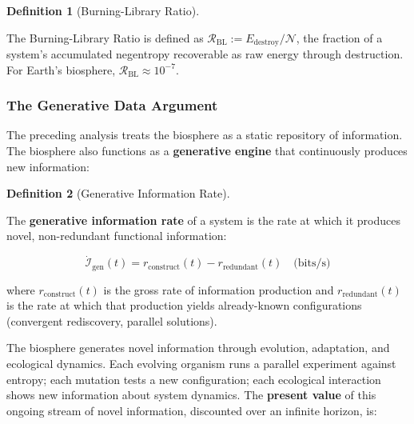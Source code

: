 \documentclass[11pt]{article}
\theoremstyle{plain}
\theoremstyle{definition}
\newtheorem{definition}{Definition}
\theoremstyle{remark}
\let\origsubsubsection\subsubsection
\renewcommand{\subsubsection}{\needspace{4\baselineskip}\origsubsubsection}
\begin{document}
\begin{definition}[Burning-Library Ratio]
\label{def-burning-library-ratio}

The Burning-Library Ratio is defined as $\mathcal{R}_{\text{BL}} := E_{\text{destroy}} / \mathcal{N}$, the fraction of a system's accumulated negentropy recoverable as raw energy through destruction. For Earth's biosphere, $\mathcal{R}_{\text{BL}} \approx 10^{-7}$.
\end{definition}

\subsubsection{The Generative Data
Argument}\label{the-generative-data-argument}

The preceding analysis treats the biosphere as a static repository of
information. The biosphere also functions as a \textbf{generative
engine} that continuously produces new information:

\begin{definition}[Generative Information Rate]
\label{def-generative-information-rate}

The \textbf{generative information rate} of a system is the rate at which it produces novel, non-redundant functional information:

$$\dot{\mathcal{I}}_{\text{gen}}(t) = r_{\text{construct}}(t) - r_{\text{redundant}}(t) \quad \text{(bits/s)}$$

where $r_{\text{construct}}(t)$ is the gross rate of information production and $r_{\text{redundant}}(t)$ is the rate at which that production yields already-known configurations (convergent rediscovery, parallel solutions).
\end{definition}

The biosphere generates novel information through evolution, adaptation,
and ecological dynamics. Each evolving organism runs a parallel
experiment against entropy; each mutation tests a new configuration;
each ecological interaction shows new information about system dynamics.
The \textbf{present value} of this ongoing stream of novel information,
discounted over an infinite horizon, is:
\end{document}
